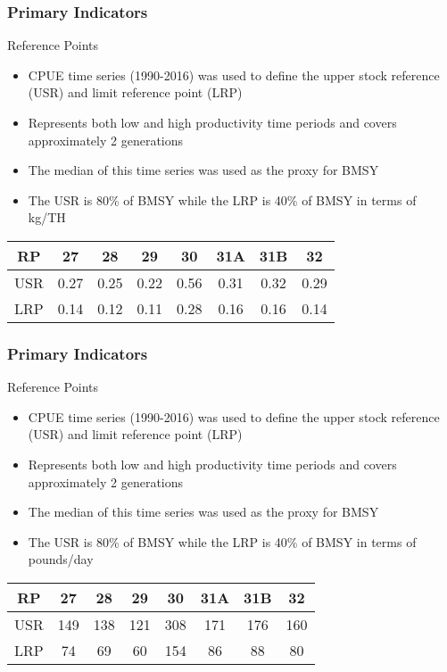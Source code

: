 \documentclass{beamer}
\begin{document}
\begin{frame}
\frametitle{Primary Indicators}
Reference Points
\begin{itemize}
\item CPUE time series (1990-2016) was used to define the upper stock reference (USR) and limit reference point (LRP) 
\item Represents both low and high productivity time periods and covers approximately 2 generations 
\item The median of this time series was used as the proxy for BMSY 
\item The USR is 80\% of BMSY while the LRP is 40\% of BMSY in terms of kg/TH
\end{itemize}
\centering
\begin{tabular}{|c|c|c|c|c|c|c|c|}
\hline
RP & 27 & 28 & 29 & 30 & 31A & 31B & 32 \\
\hline
USR & 0.27 & 0.25 & 0.22 & 0.56 & 0.31 & 0.32 & 0.29 \\
\hline
LRP & 0.14 & 0.12  & 0.11  & 0.28  & 0.16  & 0.16  & 0.14 \\
\hline
\end{tabular}
\end{frame}



\begin{frame}
\frametitle{Primary Indicators}
Reference Points
\begin{itemize}
\item CPUE time series (1990-2016) was used to define the upper stock reference (USR) and limit reference point (LRP) 
\item Represents both low and high productivity time periods and covers approximately 2 generations 
\item The median of this time series was used as the proxy for BMSY 
\item The USR is 80\% of BMSY while the LRP is 40\% of BMSY in terms of pounds/day
\end{itemize}
\centering
\begin{tabular}{|c|c|c|c|c|c|c|c|}
\hline
RP & 27 & 28 & 29 & 30 & 31A & 31B & 32 \\
\hline
USR & 149 & 138 & 121 & 308 & 171 & 176 & 160 \\
\hline
LRP & 74 & 69 & 60 & 154 & 86 & 88 & 80 \\
\hline
\end{tabular}
\end{frame}
\end{document}
